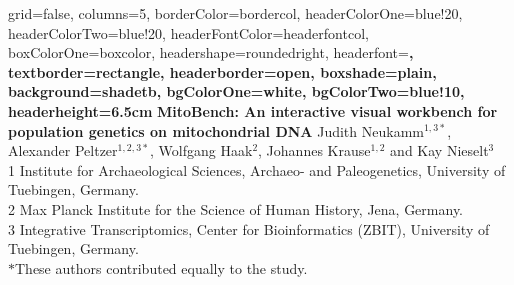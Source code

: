 \documentclass[a0paper,portrait, fontscale=0.285]{baposter}
\begin{document}


\begin{poster}{
	grid=false,
	columns=5,
	borderColor=bordercol,
	headerColorOne=blue!20,
	headerColorTwo=blue!20,
	headerFontColor=headerfontcol,
	boxColorOne=boxcolor,
	headershape=roundedright,
	headerfont=\large\sf\bf,
	textborder=rectangle,
	headerborder=open,
  	boxshade=plain,
	background=shadetb,
	bgColorOne=white,
	bgColorTwo=blue!10,
	headerheight=6.5cm
}
{
}
{\sf\bf
	MitoBench: An interactive visual workbench for population genetics on mitochondrial DNA
}
{
	\vspace{1em} Judith Neukamm$^{1,3*}$, Alexander Peltzer$^{1,2,3*}$, Wolfgang Haak$^{2}$, Johannes Krause$^{1,2}$ and Kay Nieselt$^{3}$\\
	\vspace{1em}
	{\footnotesize 	1 Institute for Archaeological Sciences, Archaeo- and Paleogenetics, University of Tuebingen, Germany.\\
	2 Max Planck Institute for the Science of Human History, Jena, Germany.\\
	3 Integrative Transcriptomics, Center for Bioinformatics (ZBIT), University of Tuebingen, Germany.\\
	$*$These authors contributed equally to the study.
	}
}
{
}
\end{poster}
\end{document}
